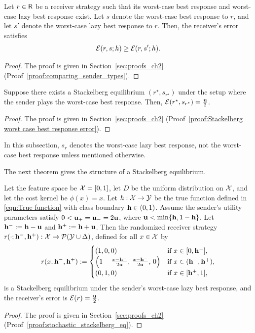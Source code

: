 \begin{proposition}\label{prop:comparing sender strategy types}
    Let $r \in \mathsf{R}$ be a receiver strategy such that its worst-case best response and worst-case lazy best response exist. Let $s$ denote the worst-case best response to $r$, and let $s'$ denote the worst-case lazy best response to $r$. Then, the receiver's error satisfies
    \[
    \mathcal{E}(r, s; h) \geq \mathcal{E}(r, s'; h).
    \]
\end{proposition}

\begin{proof} The proof is given in Section~\ref{sec:proofs_ch2} (Proof~\ref{proof:comparing_sender_types}).
\end{proof}

\begin{cor}\label{cor:Stackelberg worst case best response error}
    Suppose there exists a Stackelberg equilibrium $(r^\star, s_{r^\star})$ under the setup where the sender plays the worst-case best response. Then, $\mathcal{E}(r^\star,s_{r^\star}) = \frac{\mathbf{u}}{2}$.
\end{cor}

\begin{proof} The proof is given in Section~\ref{sec:proofs_ch2} (Proof~\ref{proof:Stackelberg worst case best response error}).
\end{proof}


\begin{notn}
In this subsection, $s_r$ denotes the worst-case lazy best response, not the worst-case best response unless mentioned otherwise.
\end{notn}

The next theorem gives the structure of a Stackelberg equilibrium.

\begin{thm}\label{thm:Stochastic Stackelberg equilibrium}
Let the feature space be $\mathcal{X} = [0,1]$, let $D$ be the uniform distribution on $\mathcal{X}$, and let the cost kernel be $\phi(x) = x$. Let $h: \mathcal{X} \to \mathcal{Y}$ be the true function defined in \eqref{eqn:True function} with class boundary $\mathbf{h} \in (0,1)$. Assume the sender's utility parameters satisfy $0 < \mathbf{u_+} = \mathbf{u_-} = 2\mathbf{u}$, where $\mathbf{u} < \min\{\mathbf{h}, 1-\mathbf{h}\}$. Let $\mathbf{h^{-}} := \mathbf{h} - \mathbf{u}$ and $\mathbf{h^{+}} := \mathbf{h} + \mathbf{u}$. Then the randomized receiver strategy $r(\cdot;\mathbf{h^{-}},\mathbf{h^{+}}): \mathcal{X} \to \mathcal{P}(\mathcal{Y} \cup \Delta)$, defined for all $x \in \mathcal{X}$ by
\begin{equation}\label{eqn:stochastic_stackelberg}
		r(x;\mathbf{h^{-}},\mathbf{h^{+}}) := \begin{cases}
			(1,0,0) & \text{if } x \in [0, \mathbf{h^{-}}], \\
			\left(1-\frac{x-\mathbf{h^{-}}}{2\mathbf{u}},\, \frac{x-\mathbf{h^{-}}}{2\mathbf{u}},\, 0\right) & \text{if } x \in (\mathbf{h^{-}},\mathbf{h^{+}}), \\
			(0,1,0) & \text{if } x \in [\mathbf{h^{+}},1],
		\end{cases}
	\end{equation}
is a Stackelberg equilibrium under the sender's worst-case lazy best response, and the receiver's error is $\mathcal{E}(r) = \frac{\mathbf{u}}{2}$.
\end{thm}

\begin{proof} The proof is given in Section~\ref{sec:proofs_ch2} (Proof~\ref{proof:stochastic_stackelberg_eq}).
\end{proof}
